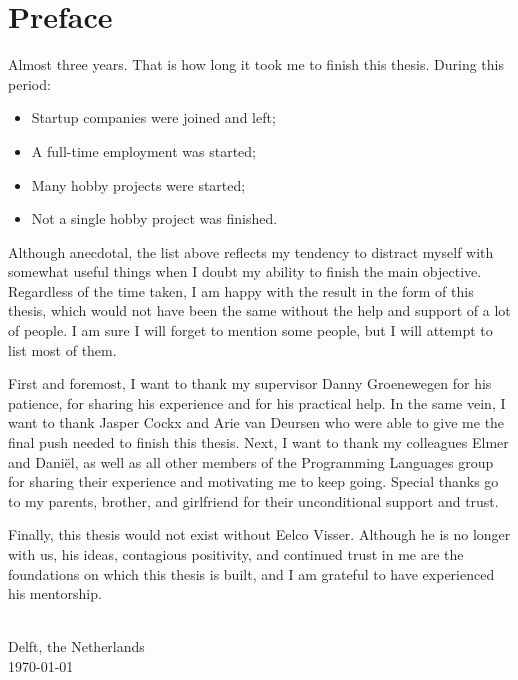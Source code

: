 
\chapter{\label{chap:Preface}Preface}

Almost three years. That is how long it took me to finish this thesis. During this period:

\begin{itemize}
 \item Startup companies were joined and left;
 \item A full-time employment was started;
 \item Many hobby projects were started;
 \item Not a single hobby project was finished.
\end{itemize}

Although anecdotal, the list above reflects my tendency to distract myself with somewhat useful things when I doubt my ability to finish the main objective.
Regardless of the time taken, I am happy with the result in the form of this thesis, which would not have been the same without the help and support of a lot of people.
I am sure I will forget to mention some people, but I will attempt to list most of them.

First and foremost, I want to thank my supervisor Danny Groenewegen for his patience, for sharing his experience and for his practical help.
In the same vein, I want to thank Jasper Cockx and Arie van Deursen who were able to give me the final push needed to finish this thesis.
Next, I want to thank my colleagues Elmer and Daniël, as well as all other members of the Programming Languages group for sharing their experience and motivating me to keep going.
Special thanks go to my parents, brother, and girlfriend for their unconditional support and trust.

Finally, this thesis would not exist without Eelco Visser.
Although he is no longer with us, his ideas, contagious positivity, and continued trust in me are the foundations on which this thesis is built, and I am grateful to have experienced his mentorship.

\vspace{1cm}
\begin{flushright}
\theauthor{}\\
Delft, the Netherlands\\
\today{}\\
\end{flushright}

